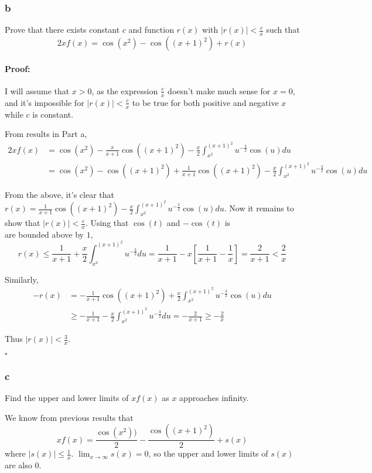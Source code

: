 \documentclass{article}
\newenvironment{proof}{\paragraph{Proof:}}{\hfill$\square$}
\begin{document}
\subsubsection*{b}
Prove that there exists constant $c$ and function $r(x)$ with $|r(x)| < \frac{c}{x}$ such that
\[
2xf(x) = \cos(x^2) - \cos((x+1)^2) + r(x)
\]

\begin{proof}
I will assume that $x>0$, as the expression $\frac{c}{x}$ doesn't make much sense for $x = 0$, and it's impossible for $|r(x)| < \frac{c}{x}$ to be true for both positive and negative $x$ while $c$ is constant.

From results in Part a,
\begin{align*}
2xf(x) &= \cos(x^2) - \frac{x}{x+1}\cos((x+1)^2)
- \frac{x}{2} \int_{x^2}^{(x+1)^2} u^{-\frac{3}{2}} \cos(u)du \\
&= \cos(x^2) - \cos((x+1)^2)
+ \frac{1}{x+1}\cos((x+1)^2) - \frac{x}{2} \int_{x^2}^{(x+1)^2} u^{-\frac{3}{2}} \cos(u)du
\end{align*}

From the above, it's clear that $r(x) = \frac{1}{x+1}\cos((x+1)^2) - \frac{x}{2} \int_{x^2}^{(x+1)^2} u^{-\frac{3}{2}} \cos(u)du$. Now it remains to show that $|r(x)| < \frac{c}{x}$. Using that $\cos(t)$ and $-\cos(t)$ is\\are bounded above by $1$,
\[
r(x) \leq \frac{1}{x+1} + \frac{x}{2}\int_{x^2}^{(x+1)^2} u^{-\frac{3}{2}}du
= \frac{1}{x+1} - x\left[\frac{1}{x+1} - \frac{1}{x} \right]
= \frac{2}{x+1} < \frac{2}{x}
\]

Similarly,
\begin{align*}
-r(x) &= -\frac{1}{x+1}\cos((x+1)^2) + \frac{x}{2} \int_{x^2}^{(x+1)^2} u^{-\frac{3}{2}} \cos(u)du \\
&\geq -\frac{1}{x+1} - \frac{x}{2}\int_{x^2}^{(x+1)^2} u^{-\frac{3}{2}}du
= -\frac{2}{x+1} \geq -\frac{2}{x}
\end{align*}

Thus $|r(x)| < \frac{3}{x}$.

\end{proof}

\subsubsection*{c}
Find the upper and lower limits of $xf(x)$ as $x$ approaches infinity.

We know from previous results that
\[
xf(x) = \frac{\cos(x^2))}{2} - \frac{\cos((x+1)^2)}{2} + s(x)
\]
where $|s(x)| \leq \frac{1}{x}$. $\lim_{x\rightarrow\infty} s(x) = 0$, so the upper and lower limits of $s(x)$ are also $0$.
\end{document}
